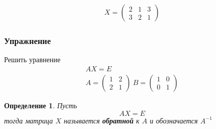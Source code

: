 \documentclass[]{article}
\newtheorem{dfn}{Определение}
\begin{document}
\begin{gather*}
X=
\left(
\begin{matrix}
	2 & 1 & 3
	\\
	3 & 2 & 1
\end{matrix}\right)
\end{gather*}
\subsubsection{Упражнение}
Решить уравнение
\begin{gather*}
	AX=E
	\\
	A=
	\begin{pmatrix}
		1 & 2
		\\
		2 & 1
	\end{pmatrix}
	\
	B=
	\begin{pmatrix}
		1 & 0
		\\
		0 & 1
	\end{pmatrix}
\end{gather*}
\begin{dfn}
	Пусть
	\begin{equation}
		AX=E
	\end{equation}
	тогда матрица $X$ называется \textbf{обратной} к $A$ и обозначается $A^{-1}$
\end{dfn}
\end{document}
